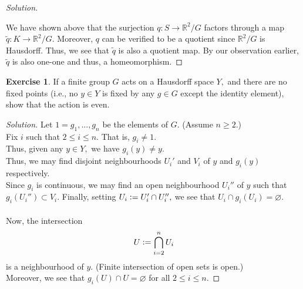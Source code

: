 \documentclass[12pt]{article}
\theoremstyle{definition}
\numberwithin{thm}{section}
\newtheorem{exe}[thm]{Exercise}
\let\emptyset\varnothing
\newenvironment{soln}{\begin{proof}[Solution]}{\end{proof}}
\begin{document}
\begin{soln}
\begin{center}
		\end{center}
		We have shown above that the surjection $q:S\to \mathbb{R}^2/G$ factors through a map $\tilde{q}:K \to \mathbb{R}^2/G.$ Moreover, $q$ can be verified to be a quotient since $\mathbb{R}^2/G$ is Hausdorff. Thus, we see that $\tilde{q}$ is also a quotient map. By our observation earlier, $\tilde{q}$ is also one-one and thus, a homeomorphism.
\end{soln}
%
\begin{exe} \label{exe:finitehausdiscontaction}
	If a finite group $G$ acts on a Hausdorff space $Y,$ and there are no fixed points (i.e., no $y \in Y$ is fixed by any $g \in G$ except the identity element), show that the action is even.
\end{exe}
\begin{soln}
	Let $1 = g_1, \ldots, g_n$ be the elements of $G.$ (Assume $n \ge 2.$) \\
	Fix $i$ such that $2 \le i \le n.$ That is, $g_i \neq 1.$\\
	Thus, given any $y \in Y,$ we have $g_i(y) \neq y.$\\
	Thus, we may find disjoint neighbourhoods $U_i'$ and $V_i$ of $y$ and $g_i(y)$ respectively.\\
	Since $g_i$ is continuous, we may find an open neighbourhood $U_i''$ of $y$ such that $g_i(U_i'') \subset V_i.$ Finally, setting $U_i\vcentcolon= U_i'\cap U_i'',$ we see that $U_i \cap g_i(U_i) = \emptyset.$\\~\\
	Now, the intersection
	\begin{equation*} 
		U \vcentcolon= \bigcap_{i = 2}^n U_i
	\end{equation*}
	is a neighbourhood of $y.$ (Finite intersection of open sets is open.)\\
	Moreover, we see that $g_i(U) \cap U = \emptyset$ for all $2 \le i \le n.$
\end{soln}
\end{document}
